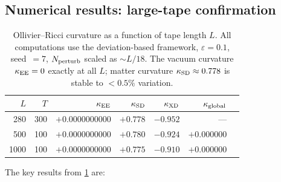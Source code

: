 \documentclass[11pt]{article}
\theoremstyle{remark}
\newcommand{\kEE}{\kappa_{\rm EE}}
\newcommand{\kSD}{\kappa_{\rm SD}}
\newcommand{\kXD}{\kappa_{\rm XD}}
\begin{document}
\subsection{Numerical results: large-tape confirmation}
\label{ssec:numerical_gorard}

\begin{table}[htbp]
\centering
\caption{Ollivier--Ricci curvature as a function of tape length $L$.
All computations use the deviation-based framework,
$\varepsilon = 0.1$, seed~$= 7$, $N_{\rm perturb}$ scaled as $\sim L/18$.
The vacuum curvature $\kEE = 0$ exactly at all $L$; matter curvature
$\kSD \approx 0.778$ is stable to $< 0.5\%$ variation.}
\label{tab:kappa_scaling}
\begin{tabular}{rrrrrrr}
\toprule
$L$ & $T$ & $\kEE$ & $\kSD$ & $\kXD$ & $\kappa_{\rm global}$ \\
\midrule
280  & 300 & $+0.0000000000$ & $+0.778$ & $-0.952$ & --- \\
500  & 100 & $+0.0000000000$ & $+0.780$ & $-0.924$ & $+0.000000$ \\
1000 & 100 & $+0.0000000000$ & $+0.775$ & $-0.910$ & $+0.000000$ \\
\bottomrule
\end{tabular}
\end{table}

The key results from \cref{tab:kappa_scaling} are:
\end{document}
